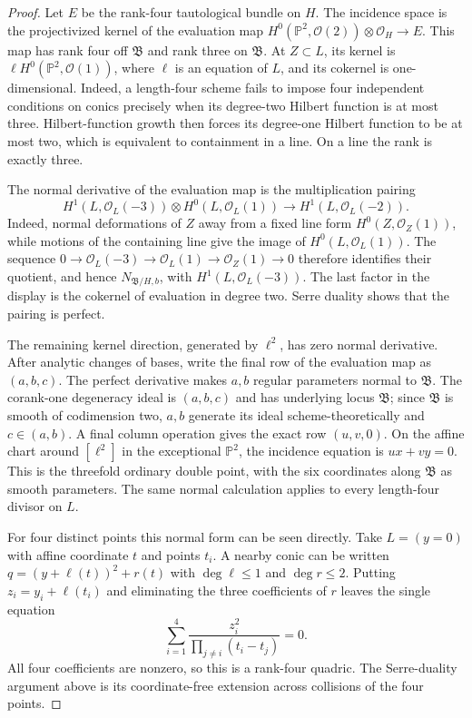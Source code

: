 \documentclass[11pt,reqno]{amsart}
\theoremstyle{definition}
\newcommand{\Pp}{\mathbb P}
\newcommand{\Ocal}{\mathcal O}
\begin{document}
\begin{proof}
Let $E$ be the rank-four tautological bundle on $H$.  The incidence space is
the projectivized kernel of the evaluation map
$H^0(\Pp^2,\Ocal(2))\otimes\Ocal_H\to E$.  This map has rank four off
$\mathfrak B$ and rank three on $\mathfrak B$.  At $Z\subset L$, its kernel
is $\ell H^0(\Pp^2,\Ocal(1))$, where $\ell$ is an equation of $L$, and its
cokernel is one-dimensional.  Indeed, a length-four scheme fails to impose
four independent conditions on conics precisely when its degree-two
Hilbert function is at most three.  Hilbert-function growth then forces its
degree-one Hilbert function to be at most two, which is equivalent to
containment in a line.  On a line the rank is exactly three.

The normal derivative of the evaluation map is the multiplication pairing
\[
 H^1(L,\Ocal_L(-3))\otimes H^0(L,\Ocal_L(1))
       \longrightarrow H^1(L,\Ocal_L(-2)).
\]
Indeed, normal deformations of $Z$ away from a fixed line form
$H^0(Z,\Ocal_Z(1))$, while motions of the containing line give the image of
$H^0(L,\Ocal_L(1))$.  The sequence
$0\to\Ocal_L(-3)\to\Ocal_L(1)\to\Ocal_Z(1)\to0$ therefore identifies their
quotient, and hence $N_{\mathfrak B/H,b}$, with
$H^1(L,\Ocal_L(-3))$.  The last factor in the display is the cokernel of
evaluation in degree two.  Serre duality
shows that the pairing is perfect.

The remaining kernel direction,
generated by $\ell^2$, has zero normal derivative.  After analytic changes
of bases, write the final row of the evaluation map as $(a,b,c)$.  The
perfect derivative makes $a,b$ regular parameters normal to
$\mathfrak B$.  The corank-one degeneracy ideal is $(a,b,c)$ and has
underlying locus $\mathfrak B$; since $\mathfrak B$ is smooth of
codimension two, $a,b$ generate its ideal scheme-theoretically and
$c\in(a,b)$.  A final column operation gives the exact row $(u,v,0)$.  On
the affine chart around
$[\ell^2]$ in the exceptional $\Pp^2$, the incidence equation is
$ux+vy=0$.  This is the threefold ordinary double point, with the six
coordinates along $\mathfrak B$ as smooth parameters.  The same normal
calculation applies to every length-four divisor on $L$.

For four distinct points this normal form can be seen directly.  Take
$L=(y=0)$ with affine coordinate $t$ and points $t_i$.  A nearby conic can
be written $q=(y+\ell(t))^2+r(t)$ with $\deg\ell\le1$ and $\deg r\le2$.
Putting $z_i=y_i+\ell(t_i)$ and eliminating the three coefficients of $r$
leaves the single equation
\[
 \sum_{i=1}^4\frac{z_i^2}{\prod_{j\ne i}(t_i-t_j)}=0.
\]
All four coefficients are nonzero, so this is a rank-four quadric.  The
Serre-duality argument above is its coordinate-free extension across
collisions of the four points.


\end{proof}
\end{document}
